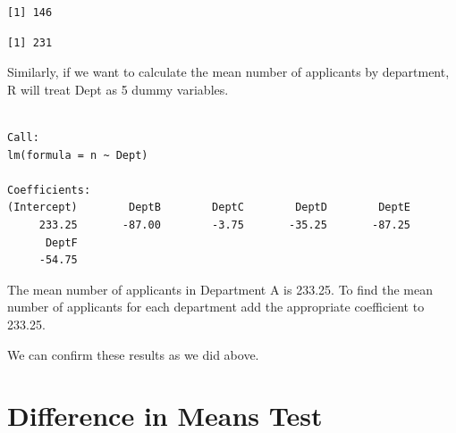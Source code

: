 \documentclass[]{book}
\newenvironment{Shaded}{\begin{snugshade}}{\end{snugshade}}
\newcommand{\CommentTok}[1]{\textcolor[rgb]{0.56,0.35,0.01}{\textit{#1}}}
\newcommand{\KeywordTok}[1]{\textcolor[rgb]{0.13,0.29,0.53}{\textbf{#1}}}
\newcommand{\NormalTok}[1]{#1}
\newcommand{\OperatorTok}[1]{\textcolor[rgb]{0.81,0.36,0.00}{\textbf{#1}}}
\newcommand{\StringTok}[1]{\textcolor[rgb]{0.31,0.60,0.02}{#1}}
\begin{document}
\begin{Shaded}
\end{Shaded}

\begin{verbatim}
[1] 146
\end{verbatim}

\begin{Shaded}
\end{Shaded}

\begin{verbatim}
[1] 231
\end{verbatim}

Similarly, if we want to calculate the mean number of applicants by department, R will treat Dept as 5 dummy variables.

\begin{Shaded}
\end{Shaded}

\begin{verbatim}

Call:
lm(formula = n ~ Dept)

Coefficients:
(Intercept)        DeptB        DeptC        DeptD        DeptE  
     233.25       -87.00        -3.75       -35.25       -87.25  
      DeptF  
     -54.75  
\end{verbatim}

The mean number of applicants in Department A is 233.25. To find the mean number of applicants for each department add the appropriate coefficient to 233.25.

We can confirm these results as we did above.

\hypertarget{difference-in-means-test}{%
\section{Difference in Means Test}\label{difference-in-means-test}}
\end{document}
